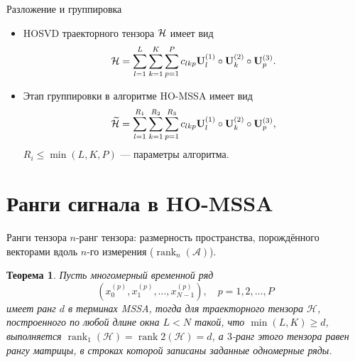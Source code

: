 \documentclass[ucs, notheorems, handout]{beamer}
\newcommand{\bluetext}[1]{{\usebeamercolor[fg]{bluetext_color}#1}}
\newtheorem{theorem}{Теорема}
\begin{document}
    \begin{frame}{Разложение и группировка}
        \begin{itemize}
            \item HOSVD траекторного тензора $\mathcal{H}$ имеет вид
            \[
                \mathcal{H} = \sum_{l=1}^{L} \sum_{k=1}^{K} \sum_{p=1}^{P} c_{lkp} \mathbf{U}^{(1)}_{l}
                \circ \mathbf{U}^{(2)}_{k} \circ \mathbf{U}^{(3)}_{p}.
            \]

            \vspace{0.4cm}
            \item Этап группировки в алгоритме HO-MSSA имеет вид
            \[
                \widetilde{\mathcal{H}} = \sum_{l=1}^{R_1} \sum_{k=1}^{R_2} \sum_{p=1}^{R_3} c_{lkp} \mathbf{U}^{(1)}_{l}
                \circ \mathbf{U}^{(2)}_{k} \circ \mathbf{U}^{(3)}_{p},
            \]
            $R_i\leqslant \min(L, K, P)$ --- параметры алгоритма.
        \end{itemize}
    \end{frame}


    \section{Ранги сигнала в HO-MSSA}\label{sec:tensor-ranks}
    \begin{frame}{Ранги тензора}
        \bluetext{$n$-ранг тензора:} размерность пространства, порождённого
        векторами вдоль $n$-го измерения ($\operatorname{rank}_n(\mathcal{A})$).

        \begin{theorem}
            Пусть многомерный временной ряд
            \[
                \left( x_0^{(p)}, x_1^{(p)}, \ldots, x_{N-1}^{(p)} \right), \quad p=1, 2,\ldots, P
            \]
            имеет ранг $d$ в терминах MSSA, тогда для траекторного тензора $\mathcal{H}$, построенного по любой длине окна $L<N$
            такой, что ${\min(L, K) \geqslant d}$, выполняется $\operatorname{rank}_1(\mathcal{H})=\operatorname{rank}2(\mathcal{H})=d$,
            а $3$-ранг этого тензора равен рангу матрицы, в строках которой записаны заданные одномерные ряды.
        \end{theorem}
    \end{frame}
\end{document}
